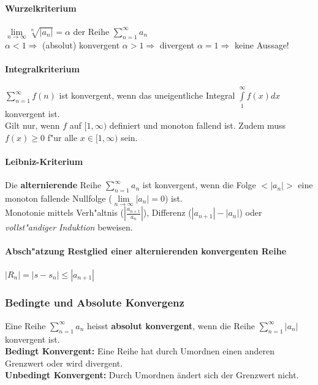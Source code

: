 \paragraph{Wurzelkriterium}
  $ \lim\limits_{n \to \infty} \sqrt[n]{\left|a_n\right|} = \alpha $ der Reihe $
\sum\limits_{n=1}^{\infty} a_n $ \\ $\alpha < 1 \Rightarrow$ (absolut) konvergent\hspace{3cm}
  $\alpha > 1 \Rightarrow$ divergent \hspace{4cm} 
  $\alpha = 1 \Rightarrow$ keine Aussage!

\paragraph{Integralkriterium}
  $ \sum\limits_{n=1}^{\infty} f(n) $ ist konvergent, wenn das uneigentliche
Integral $ \int\limits_{1}^{\infty} f(x) dx $ konvergent ist. \\ Gilt nur, wenn $f$ auf $ [1, \infty) $ definiert und monoton fallend ist. Zudem muss $ f(x) \geq 0 $ f"ur alle $x \in [1, \infty)$ sein.
 
\paragraph{Leibniz-Kriterium}
  Die \textbf{alternierende} Reihe $ \sum\limits_{n=1}^{\infty} a_n $ ist
  konvergent, wenn die Folge $<\left|a_n\right|>$ eine monoton fallende Nullfolge ($\lim\limits_{n \to \infty} \left|a_n\right| = 0 $) ist. \\ Monotonie mittels Verh"altnis ($ \left|\frac{a_{n+1}}{a_n}\right| $),
Differenz ($ |a_{n+1}| - |a_n| $) oder \textit{vollst"andiger Induktion}
beweisen.\\

\paragraph{Absch"atzung Restglied einer alternierenden konvergenten
  Reihe}\qquad $|R_n| = |s-s_n|\leq |a_{n+1}|$


\subsubsection{Bedingte und Absolute Konvergenz}
  Eine Reihe $\sum\limits_{n=1}^{\infty}a_n$ heisst \textbf{absolut konvergent},
wenn die Reihe $\sum\limits_{n=1}^{\infty}|a_n|$ konvergent ist.\\
\textbf{Bedingt Konvergent:} Eine Reihe hat durch Umordnen einen anderen
Grenzwert oder wird divergent.\\
\textbf{Unbedingt Konvergent:} Durch Umordnen \"andert sich der Grenzwert nicht.

